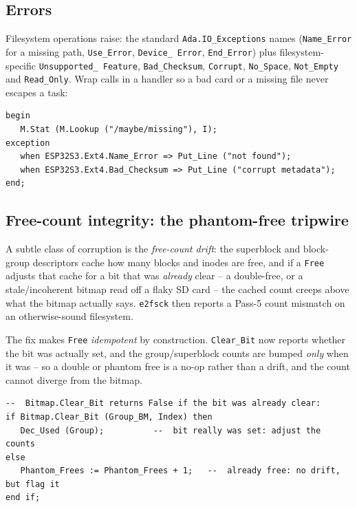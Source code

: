 \subsection{Errors}

Filesystem operations raise: the standard \texttt{Ada.IO\_Exceptions} names
(\texttt{Name\_Error} for a missing path, \texttt{Use\_Error}, \texttt{Device\_%
Error}, \texttt{End\_Error}) plus filesystem-specific \texttt{Unsupported\_%
Feature}, \texttt{Bad\_Checksum}, \texttt{Corrupt}, \texttt{No\_Space},
\texttt{Not\_Empty} and \texttt{Read\_Only}. Wrap calls in a handler so a bad card
or a missing file never escapes a task:

\begin{lstlisting}
begin
   M.Stat (M.Lookup ("/maybe/missing"), I);
exception
   when ESP32S3.Ext4.Name_Error => Put_Line ("not found");
   when ESP32S3.Ext4.Bad_Checksum => Put_Line ("corrupt metadata");
end;
\end{lstlisting}

\subsection{Free-count integrity: the phantom-free tripwire}

A subtle class of corruption is the \emph{free-count drift}: the superblock and
block-group descriptors cache how many blocks and inodes are free, and if a
\texttt{Free} adjusts that cache for a bit that was \emph{already} clear -- a
double-free, or a stale/incoherent bitmap read off a flaky SD card -- the cached
count creeps above what the bitmap actually says. \texttt{e2fsck} then reports a
Pass-5 count mismatch on an otherwise-sound filesystem.

The fix makes \texttt{Free} \emph{idempotent} by construction. \texttt{Clear\_Bit}
now reports whether the bit was actually set, and the group/superblock counts are
bumped \emph{only} when it was -- so a double or phantom free is a no-op rather
than a drift, and the count cannot diverge from the bitmap.

\begin{lstlisting}
--  Bitmap.Clear_Bit returns False if the bit was already clear:
if Bitmap.Clear_Bit (Group_BM, Index) then
   Dec_Used (Group);          --  bit really was set: adjust the counts
else
   Phantom_Frees := Phantom_Frees + 1;   --  already free: no drift, but flag it
end if;
\end{lstlisting}

